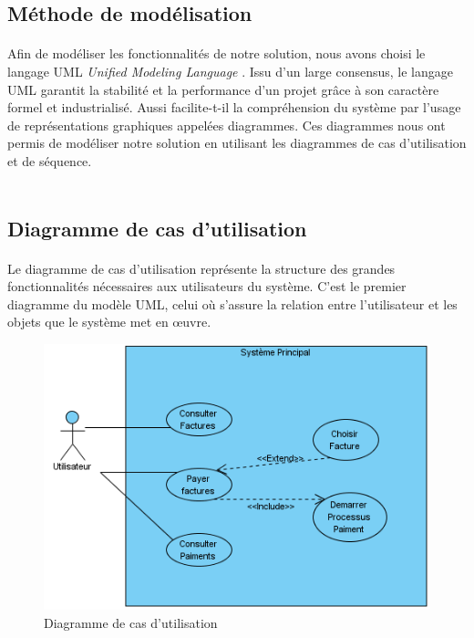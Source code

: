 \subsection{Méthode de modélisation}
      \paragraph{}
      Afin de modéliser les fonctionnalités de notre solution, nous avons choisi le langage UML \textit{Unified Modeling Language} \cite{I}. Issu d’un large consensus, le langage UML garantit la stabilité et la performance d’un projet grâce à son caractère formel et industrialisé. Aussi facilite-t-il la compréhension du système par l’usage de représentations graphiques appelées diagrammes. Ces diagrammes nous ont permis de modéliser notre solution en utilisant les diagrammes de cas d’utilisation et de séquence.\\ \\
\subsection{Diagramme de cas d'utilisation}
    \paragraph{}
	  Le diagramme de cas d'utilisation représente la structure des grandes fonctionnalités nécessaires aux utilisateurs du système. C'est le premier diagramme du modèle UML, celui où s'assure la relation entre l'utilisateur et les objets que le système met en œuvre. 

	  \begin{figure}[H]
		     \begin{center}
			\includegraphics[scale=0.5]{images/uc.png}
		     \end{center}
		     \caption{Diagramme de cas d'utilisation}
		     \label{Diagramme de cas d'utilisation}
	  \end{figure}
	  
